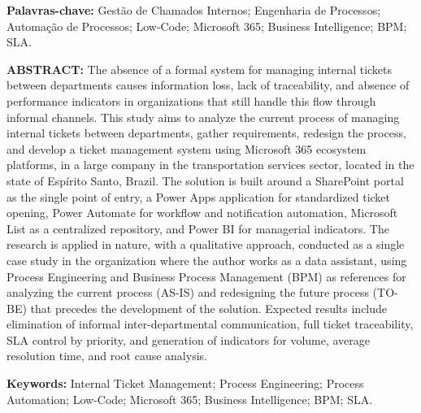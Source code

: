 \documentclass[a4paper,12pt]{article}
\begin{document}
\textbf{Palavras-chave:} Gestão de Chamados Internos;
Engenharia de Processos; Automação de Processos; Low-Code;
Microsoft 365; Business Intelligence; BPM; SLA.
 
\vspace{0.08cm}
 
\textbf{ABSTRACT:} The absence of a formal system for managing
internal tickets between departments causes information loss,
lack of traceability, and absence of performance indicators in
organizations that still handle this flow through informal
channels. This study aims to analyze the current process of
managing internal tickets between departments, gather
requirements, redesign the process, and develop a ticket
management system using Microsoft 365 ecosystem platforms, in
a large company in the transportation services sector, located
in the state of Espírito Santo, Brazil. The solution is built
around a SharePoint portal as the single point of entry, a
Power Apps application for standardized ticket opening, Power
Automate for workflow and notification automation, Microsoft
List as a centralized repository, and Power BI for managerial
indicators. The research is applied in nature, with a
qualitative approach, conducted as a single case study in the
organization where the author works as a data assistant, using
Process Engineering and Business Process Management (BPM) as
references for analyzing the current process (AS-IS) and
redesigning the future process (TO-BE) that precedes the
development of the solution. Expected results include
elimination of informal inter-departmental communication, full
ticket traceability, SLA control by priority, and generation of
indicators for volume, average resolution time, and root cause
analysis.
 
\textbf{Keywords:} Internal Ticket Management; Process
Engineering; Process Automation; Low-Code; Microsoft 365;
Business Intelligence; BPM; SLA.
 
\vspace{1cm}




\printbibliography
\end{document}
